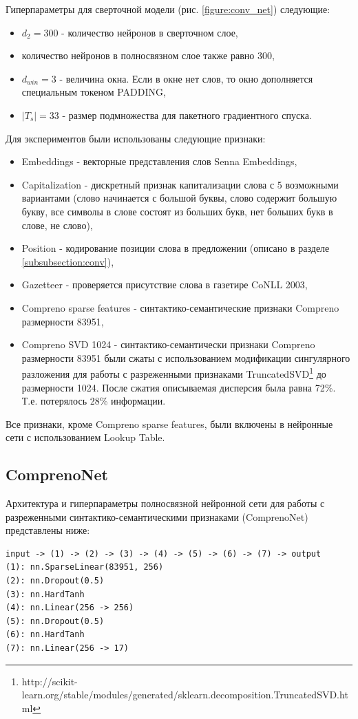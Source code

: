 Гиперпараметры для сверточной модели (рис. \ref{figure:conv_net}) следующие:
\begin{itemize}
\item $d_2 = 300$ - количество нейронов в сверточном слое,
\item количество нейронов в полносвязном слое также равно 300,
\item $d_{win} = 3$ - величина окна. Если в окне нет слов, то окно дополняется специальным токеном PADDING,
\item $|T_s|=33$ - размер подмножества для пакетного градиентного спуска.
\end{itemize}

Для экспериментов были использованы следующие признаки:
\begin{itemize}
\item Embeddings - векторные представления слов Senna Embeddings,
\item Capitalization - дискретный признак капитализации слова с 5 возможными вариантами
(слово начинается с большой буквы, слово содержит большую букву,
все символы в слове состоят из больших букв, нет больших букв в слове, не слово),
\item Position - кодирование позиции слова в предложении (описано в разделе \ref{subsubsection:conv}),
\item Gazetteer - проверяется присутствие слова в газетире CoNLL 2003,
\item Compreno sparse features - синтактико-се\-ман\-ти\-ческие признаки Compreno размерности 83951,
\item Compreno SVD 1024 - синтактико-семантически признаки Compreno размерности 83951 были сжаты с использованием
модификации сингулярного разложения для работы с разреженными признаками
TruncatedSVD\footnote{http://scikit-learn.org/stable/modules/generated/sklearn.decomposition.TruncatedSVD.html}
до размерности 1024. После сжатия описываемая дисперсия была равна 72\%. Т.е. потерялось 28\% информации.
\end{itemize}

Все признаки, кроме Compreno sparse features, были включены в нейронные сети с использованием Lookup Table.


\subsection{ComprenoNet}

Архитектура и гиперпараметры полносвязной нейронной сети для работы с разреженными
синтактико-семантическими признаками (ComprenoNet) представлены ниже:
\begin{lstlisting}
input -> (1) -> (2) -> (3) -> (4) -> (5) -> (6) -> (7) -> output
(1): nn.SparseLinear(83951, 256)
(2): nn.Dropout(0.5)
(3): nn.HardTanh
(4): nn.Linear(256 -> 256)
(5): nn.Dropout(0.5)
(6): nn.HardTanh
(7): nn.Linear(256 -> 17)
\end{lstlisting}

